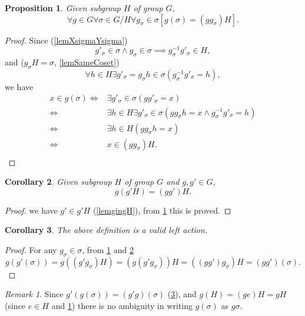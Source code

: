 \documentclass[12pt, letterpaper]{article}
\newtheorem{prop}{Proposition}[section]
\newtheorem{cor}[prop]{Corollary}
\theoremstyle{definition}
\theoremstyle{remark}
\newtheorem*{rem*}{Remark}
\theoremstyle{definition}
\theoremstyle{plain}
\numberwithin{equation}{section}
\begin{document}
	\begin{prop}\label{prop3.53}
		Given subgroup $H$ of group $G$,
		\[\forall g\in G\forall \sigma \in G/H\forall g_\sigma\in\sigma[ g(\sigma)= (gg_{\sigma})H].\]
	\end{prop}
	\begin{proof}
		Since (\ref{lemXsigmaYsigma})
		\[g'_\sigma\in\sigma\land g_\sigma\in\sigma \implies g_\sigma^{-1}g'_\sigma\in H, \]
		and ($g_\sigma H=\sigma$, \ref{lemSameCoset})
		\[ \forall h \in H \exists g'_\sigma=g_\sigma h\in \sigma (g^{-1}_\sigma g'_\sigma=h),\]
		we have
		\[\begin{aligned}
			x\in g(\sigma)\iff &\exists g'_\sigma\in\sigma(gg'_\sigma=x)\\
			\iff& \exists h\in H\exists g'_\sigma\in\sigma(gg_\sigma h=x\land g_\sigma^{-1}g'_\sigma=h)\\
			\iff &\exists h\in H(gg_\sigma h=x)\\
			\iff& x\in(gg_\sigma)H.\\
		\end{aligned}
		\]
	\end{proof}
	\begin{cor}\label{cor3.54}
		Given subgroup $H$ of group $G$ and $g,g'\in G$,
		\[g(g'H)=(gg')H.\]
	\end{cor}
	\begin{proof}
		we have $g'\in g'H$ (\ref{lemgingH}), from \ref{prop3.53} this is proved.
	\end{proof}
	\begin{cor}\label{lemValidLeftAction}
		The above definition is a valid left action.
	\end{cor}
	\begin{proof}
		For any $g_\sigma\in\sigma$,
		 from \ref{prop3.53} and \ref{cor3.54}
		\[g(g'(\sigma))=g((g'g_\sigma)H)=(g(g'g_\sigma))H=((gg')g_\sigma)H=(gg')(\sigma).\]
	\end{proof}
	\begin{rem*}\label{rem_g_sigma}
		Since  $g'(g(\sigma))=(g'g)(\sigma)$ (\ref{lemValidLeftAction}),
		and $g(H)=(ge)H=gH$ (since $e\in H$ and \ref{prop3.53})
		there is no ambiguity
		in writing $g(\sigma)$ as $g\sigma$.
	\end{rem*}
\end{document}
